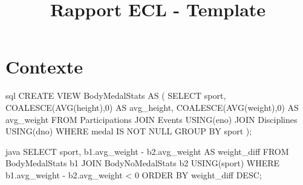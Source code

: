 \documentclass{mytex}
\title{Rapport ECL - Template} %
\begin{document}
	
	
	
	
	
	
	\fairemarges %
	\fairepagedegarde %
	\tabledematieres %
	
	
	\section{Contexte} 
	
	\begin{codeboxlang}[title=Physique des médaillés par sport]{sql}
		CREATE VIEW BodyMedalStats AS (
		SELECT sport, COALESCE(AVG(height),0) AS avg_height, COALESCE(AVG(weight),0) AS avg_weight
		FROM Participations
		JOIN Events USING(eno)
		JOIN Disciplines USING(dno)
		WHERE medal IS NOT NULL
		GROUP BY sport
		);
	\end{codeboxlang}
	
	
	
	\begin{codeboxlang}[title=Le code java !]{java}
		SELECT sport, b1.avg_weight - b2.avg_weight AS weight_diff
		FROM BodyMedalStats b1
		JOIN BodyNoMedalStats b2 USING(sport) 
		WHERE b1.avg_weight - b2.avg_weight < 0
		ORDER BY weight_diff DESC;
	\end{codeboxlang}
	
	\merci
	
\end{document}
